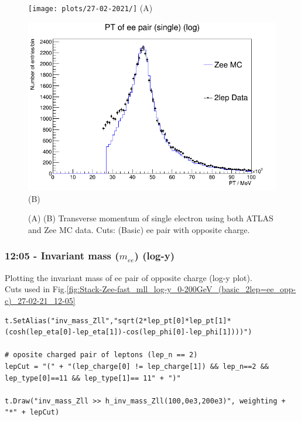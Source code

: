 \begin{figure}[h!]
    \centering
    \begin{minipage}{0.5\textwidth}
        \centering
        \texttt{[image: plots/27-02-2021/]}
        (A)
    \end{minipage}\hfill
    \begin{minipage}{0.5\textwidth}
        \centering
        \includegraphics[width=\linewidth]{plots/27-02-2021/2-stack-fast_PT-single_(basic_2lep=ee-opp-c)_27-02-21_12-03.png}
        (B)
    \end{minipage}
    \caption{(A)  (B) Transverse momentum of single electron using both ATLAS and Zee MC data.  Cuts: (Basic) ee pair with opposite charge.}
    \label{fig:stack-fast_PT-single_(basic_2lep=ee-opp-c)_27-02-21_12-03}
\end{figure}

\subsubsection*{12:05 - Invariant mass ($m_{ee}$) (log-y)}
Plotting the invariant mass of ee pair of opposite charge (log-y plot).
\\
Cuts used in Fig.\ref{fig:Stack-Zee-fast_mll_log-y_0-200GeV_(basic_2lep=ee_opp-c)_27-02-21_12-05}
\begin{lstlisting}
t.SetAlias("inv_mass_Zll","sqrt(2*lep_pt[0]*lep_pt[1]*(cosh(lep_eta[0]-lep_eta[1])-cos(lep_phi[0]-lep_phi[1])))")

# oposite charged pair of leptons (lep_n == 2)
lepCut = "(" + "(lep_charge[0] != lep_charge[1]) && lep_n==2 && lep_type[0]==11 && lep_type[1]== 11" + ")"
    
t.Draw("inv_mass_Zll >> h_inv_mass_Zll(100,0e3,200e3)", weighting + "*" + lepCut) 
\end{lstlisting}

